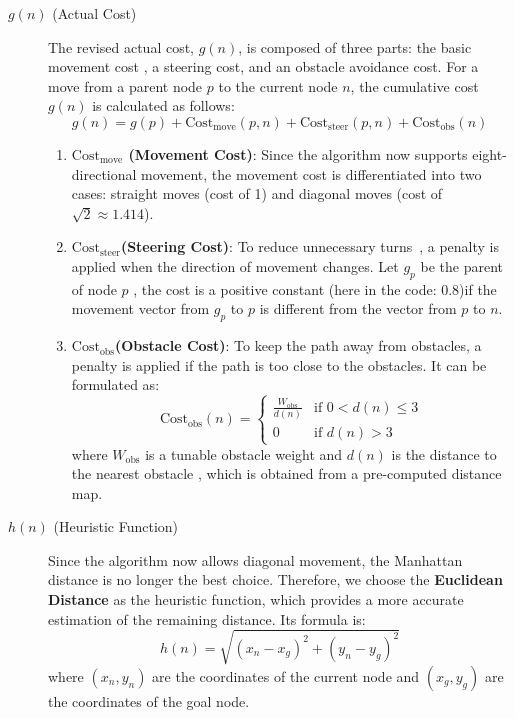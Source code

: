 \documentclass[aps,letterpaper,10pt]{revtex4}
\begin{document}
\begin{description}
    \item[$g(n)$ (Actual Cost)] The revised actual cost, $g(n)$, is composed of three parts: the basic movement cost , a steering cost, and an obstacle avoidance cost. For a move from a parent node $p$ to the current node $n$, the cumulative cost $g(n)$ is calculated as follows:
    $$g(n) = g(p) + \text{Cost}_{\text{move}}(p, n) + \text{Cost}_{\text{steer}}(p, n) + \text{Cost}_{\text{obs}}(n)$$
    \begin{enumerate}
        \item \textbf{$\text{Cost}_{\text{move}}$ (Movement Cost)}: Since the algorithm now supports eight-directional movement, the movement cost is differentiated into two cases: straight moves (cost of 1) and diagonal moves (cost of $\sqrt{2} \approx 1.414$).
        
        \item \textbf{$\text{Cost}_{\text{steer}}$(Steering Cost)}: To reduce unnecessary turns~, a penalty is applied when the direction of movement changes. Let $g_p$ be the parent of node $p$ ,  the cost is a positive constant (here in the code: 0.8)if the movement vector from $g_p$ to $p$ is different from the vector from $p$ to $n$.
        
        \item \textbf{$\text{Cost}_{\text{obs}}$(Obstacle Cost)}: To keep the path away from obstacles, a penalty is applied if the path is too close to the obstacles.  It can be formulated as:
		$$
		\text{Cost}_{\text{obs}}(n) = 
		\begin{cases} 
		  \frac{W_{\text{obs}}}{d(n)} & \text{if } 0 < d(n) \le 3 \\
		  0 & \text{if } d(n) > 3
		\end{cases}
		$$
		where $W_{\text{obs}}$ is a tunable obstacle weight and $d(n)$ is the distance to the nearest obstacle , which is obtained from a pre-computed distance map. 
    \end{enumerate}

    \item[$h(n)$ (Heuristic Function)] Since the algorithm now allows diagonal movement, the Manhattan distance is no longer the best choice. Therefore, we choose the \textbf{Euclidean Distance} as the heuristic function, which provides a more accurate estimation of the remaining distance. Its formula is:
    $$h(n) = \sqrt{(x_n - x_g)^2 + (y_n - y_g)^2}$$
    where $(x_n, y_n)$ are the coordinates of the current node and $(x_g, y_g)$ are the coordinates of the goal node.

\end{description}
\end{document}
